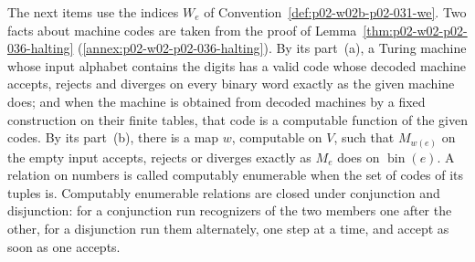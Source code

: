 The next items use the indices \(W_e\) of
Convention~\ref{def:p02-w02b-p02-031-we}.  Two facts about machine codes are
taken from the proof of Lemma~\ref{thm:p02-w02-p02-036-halting}
(\cref{annex:p02-w02-p02-036-halting}).  By its part~(a), a Turing machine
whose input alphabet contains the digits has a valid code whose decoded machine
accepts, rejects and diverges on every binary word exactly as the given machine
does; and when the machine is obtained from decoded machines by a fixed
construction on their finite tables, that code is a computable function of the
given codes.  By its part~(b), there is a map \(w\), computable on \(V\), such
that \(M_{w(e)}\) on the empty input accepts, rejects or diverges exactly as
\(M_e\) does on \(\operatorname{bin}(e)\).  A relation on numbers is called
computably enumerable when the set of codes of its tuples is.  Computably
enumerable relations are closed under conjunction and disjunction: for a
conjunction run recognizers of the two members one after the other, for a
disjunction run them alternately, one step at a time, and accept as soon as
one accepts.

